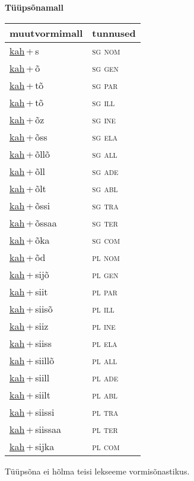 
\vspace{1.8em}
\begin{minipage}{\textwidth}
\textbf{Tüüpsõnamall \,}\\

\begin{sideways}
\begin{tabular}{l l}
muutvormimall & tunnused \\
\hline
\underline{kah}\,+\,s & \textsc{ sg nom } \\
\underline{kah}\,+\,õ & \textsc{ sg gen } \\
\underline{kah}\,+\,tõ & \textsc{ sg par } \\
\underline{kah}\,+\,tõ & \textsc{ sg ill } \\
\underline{kah}\,+\,õz & \textsc{ sg ine } \\
\underline{kah}\,+\,õss & \textsc{ sg ela } \\
\underline{kah}\,+\,õllõ & \textsc{ sg all } \\
\underline{kah}\,+\,õll & \textsc{ sg ade } \\
\underline{kah}\,+\,õlt & \textsc{ sg abl } \\
\underline{kah}\,+\,õssi & \textsc{ sg tra } \\
\underline{kah}\,+\,õssaa & \textsc{ sg ter } \\
\underline{kah}\,+\,õka & \textsc{ sg com } \\
\underline{kah}\,+\,õd & \textsc{ pl nom } \\
\underline{kah}\,+\,sijõ & \textsc{ pl gen } \\
\underline{kah}\,+\,siit & \textsc{ pl par } \\
\underline{kah}\,+\,siisõ & \textsc{ pl ill } \\
\underline{kah}\,+\,siiz & \textsc{ pl ine } \\
\underline{kah}\,+\,siiss & \textsc{ pl ela } \\
\underline{kah}\,+\,siillõ & \textsc{ pl all } \\
\underline{kah}\,+\,siill & \textsc{ pl ade } \\
\underline{kah}\,+\,siilt & \textsc{ pl abl } \\
\underline{kah}\,+\,siissi & \textsc{ pl tra } \\
\underline{kah}\,+\,siissaa & \textsc{ pl ter } \\
\underline{kah}\,+\,sijka & \textsc{ pl com } \\
\end{tabular}
\end{sideways}
\label{tab:tüüpsõnamall-kahs}

\end{minipage}

 
\vspace{1em}
\noindent Tüüpsõna ei hõlma teisi lekseeme vormi\-sõnastikus.
